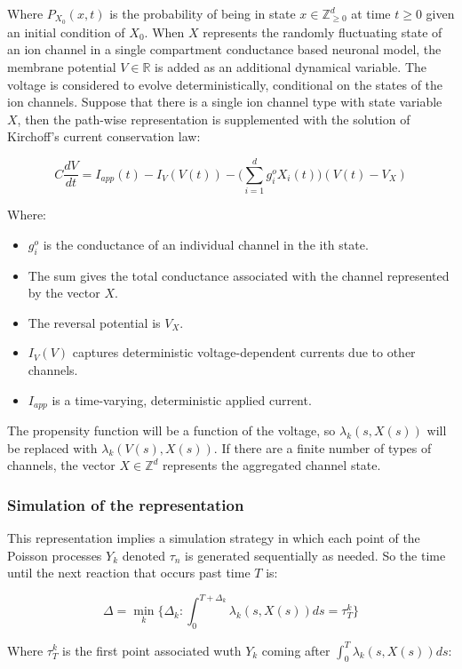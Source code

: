 	Where $P_{X_0}(x, t)$ is the probability of being in state $x\in\mathbb{Z}^d_{\ge 0}$ at time $t\ge 0$ given an initial condition of $X_0$.
	When $X$ represents the randomly fluctuating state of an ion channel in a single compartment conductance based neuronal model, the membrane potential $V\in\mathbb{R}$ is added as an additional dynamical variable.
	The voltage is considered to evolve deterministically, conditional on the states of the ion channels.
	Suppose that there is a single ion channel type with state variable $X$, then the path-wise representation is supplemented with the solution of Kirchoff's current conservation law:

	$$C\frac{dV}{dt} = I_{app}(t)-I_V(V(t))-\biggl(\sum\limits_{i=1}^dg_i^oX_i(t)\biggr)(V(t)-V_X)$$

	Where:

	\begin{itemize}
		\item $g_i^o$ is the conductance of an individual channel in the ith state.
		\item The sum gives the total conductance associated with the channel represented by the vector $X$.
		\item The reversal potential is $V_X$.
		\item $I_V(V)$ captures deterministic voltage-dependent currents due to other channels.
		\item $I_{app}$ is a time-varying, deterministic applied current.
	\end{itemize}

	The propensity function will be a function of the voltage, so $\lambda_k(s, X(s))$ will be replaced with $\lambda_k(V(s), X(s))$.
	If there are a finite number of types of channels, the vector $X\in\mathbb{Z}^d$ represents the aggregated channel state.

		\subsubsection{Simulation of the representation}
		This representation implies a simulation strategy in which each point of the Poisson processes $Y_k$ denoted $\tau_n$ is generated sequentially as needed.
		So the time until the next reaction that occurs past time $T$ is:

		$$\Delta = \min\limits_k\biggl\{\Delta_k:\int_0^{T+\Delta_k}\lambda_k(s, X(s))ds = \tau_T^k\biggr\}$$

		Where $\tau_T^k$ is the first point associated wuth $Y_k$ coming after $\int_0^T\lambda_k(s, X(s))ds$:

